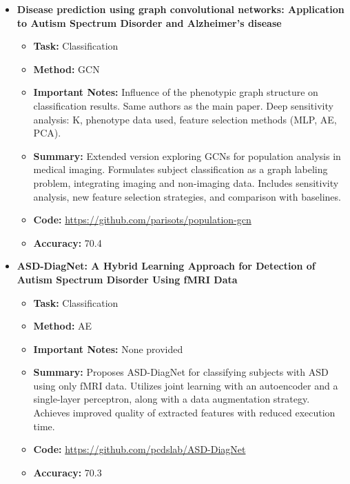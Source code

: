 \documentclass{article}
\begin{document}
\begin{itemize}[left=0pt]
  \item \textbf{Disease prediction using graph convolutional networks: Application to Autism Spectrum Disorder and Alzheimer’s disease}
  \begin{itemize}
    \item \textbf{Task:} Classification
    \item \textbf{Method:} GCN
    \item \textbf{Important Notes:} Influence of the phenotypic graph structure on classification results. Same authors as the main paper. Deep sensitivity analysis: K, phenotype data used, feature selection methods (MLP, AE, PCA).
    \item \textbf{Summary:} Extended version exploring GCNs for population analysis in medical imaging. Formulates subject classification as a graph labeling problem, integrating imaging and non-imaging data. Includes sensitivity analysis, new feature selection strategies, and comparison with baselines.
    \item \textbf{Code:} \url{https://github.com/parisots/population-gcn}
    \item \textbf{Accuracy:} 70.4
  \end{itemize}

  \item \textbf{ASD-DiagNet: A Hybrid Learning Approach for Detection of Autism Spectrum Disorder Using fMRI Data}
  \begin{itemize}
    \item \textbf{Task:} Classification
    \item \textbf{Method:} AE
    \item \textbf{Important Notes:} None provided
    \item \textbf{Summary:} Proposes ASD-DiagNet for classifying subjects with ASD using only fMRI data. Utilizes joint learning with an autoencoder and a single-layer perceptron, along with a data augmentation strategy. Achieves improved quality of extracted features with reduced execution time.
    \item \textbf{Code:} \url{https://github.com/pcdslab/ASD-DiagNet}
    \item \textbf{Accuracy:} 70.3
  \end{itemize}


\end{itemize}
\end{document}
